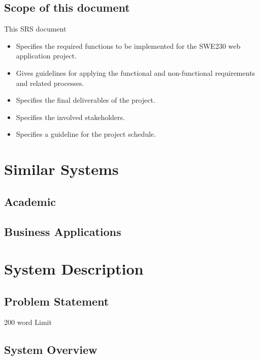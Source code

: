\documentclass[12pt]{article}
\begin{document}
\subsection{Scope of this document}
This SRS document
\begin{itemize}
    \item Specifies the required functions to be implemented for the SWE230 web application project. 
    \item Gives guidelines for applying the functional and non-functional requirements and related processes.
    \item Specifies the final deliverables of the project.
    \item Specifies the involved stakeholders. 
    \item Specifies a guideline for the project schedule.
\end{itemize}




\section{Similar Systems}
\subsection{Academic}

\subsection{Business Applications}
\section{System Description}

\subsection{Problem Statement}
200 word Limit

\subsection{System Overview}
\end{document}
